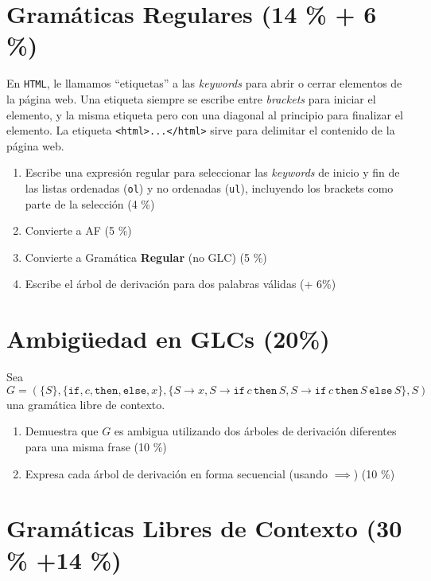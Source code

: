 \documentclass[8pt, onside]{article}
\begin{document}
\section{Gramáticas Regulares (14 \% + 6 \%)}

En \texttt{HTML}, le llamamos ``etiquetas'' a las \textit{keywords} para abrir o cerrar elementos de la página web.
Una etiqueta siempre se escribe entre \textit{brackets} para iniciar el elemento, y la misma etiqueta pero con una diagonal al principio para finalizar el elemento.
La etiqueta \verb|<html>...</html>| sirve para delimitar el contenido de la página web.

\begin{enumerate}[label=\tt \alph*)]
    \itemsep0em
    \item Escribe una expresión regular para seleccionar las \textit{keywords} de inicio y fin de las listas ordenadas (\texttt{ol}) y no ordenadas (\texttt{ul}), incluyendo los brackets como parte de la selección (4 \%)
    \item Convierte a AF (5 \%)
    \item Convierte a Gramática \textbf{Regular} (no GLC) (5 \%)
    \item Escribe el árbol de derivación para dos palabras válidas (+ 6\%)
\end{enumerate}


\section{Ambigüedad en GLCs (20\%)}

Sea $G=(\{S\},\{\mathtt{if}, c, \mathtt{then}, \mathtt{else}, x\}, \{S \to x, S \to \mathtt{if} \, c \, \mathtt{then} \, S, S \to \mathtt{if} \, c \, \mathtt{then} \, S \, \mathtt{else} \, S\}, S)$ una gramática libre de contexto.

\begin{enumerate}[label=\tt \alph*)]
    \item Demuestra que $G$ es ambigua utilizando dos árboles de derivación diferentes para una misma frase (10 \%)
    \item Expresa cada árbol de derivación en forma secuencial (usando $\implies$) (10 \%)
\end{enumerate}


\section{Gramáticas Libres de Contexto (30 \% +14 \%)}
\end{document}
